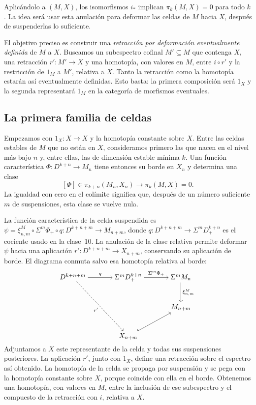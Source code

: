 Aplicándolo a $(M,X)$, los isomorfismos $i_*$ implican $\pi_k(M,X)=0$ para todo $k$. La idea será usar esta anulación para deformar las celdas de $M$ hacia $X$, después de suspenderlas lo suficiente.

El objetivo preciso es construir una \emph{retracción por deformación eventualmente definida} de $M$ a $X$. Buscamos un subespectro cofinal $M'\subseteq M$ que contenga $X$, una retracción $r'\colon M'\to X$ y una homotopía, con valores en $M$, entre $i\circ r'$ y la restricción de $1_M$ a $M'$, relativa a $X$. Tanto la retracción como la homotopía estarán así eventualmente definidas. Esto basta: la primera composición será $1_X$ y la segunda representará $1_M$ en la categoría de morfismos eventuales.

\subsection{La primera familia de celdas}

Empezamos con $1_X\colon X\to X$ y la homotopía constante sobre $X$. Entre las celdas estables de $M$ que no están en $X$, consideramos primero las que nacen en el nivel más bajo $n$ y, entre ellas, las de dimensión estable mínima $k$. Una función característica $\Phi\colon D^{k+n}\to M_n$ tiene entonces su borde en $X_n$ y determina una clase
\[
[\Phi]\in\pi_{k+n}(M_n,X_n)
\longrightarrow\pi_k(M,X)=0.
\]
La igualdad con cero en el colímite significa que, después de un número suficiente $m$ de suspensiones, esta clase se vuelve nula.

La función característica de la celda suspendida es
$\psi=\xi^M_{n,m}\circ\Sigma^m\Phi_+\circ q\colon D^{k+n+m}\to M_{n+m}$, donde $q\colon D^{k+n+m}\to\Sigma^mD^{k+n}_+$ es el cociente usado en la clase~10. La anulación de la clase relativa permite deformar $\psi$ hacia una aplicación $r'\colon D^{k+n+m}\to X_{n+m}$, conservando su aplicación de borde. El diagrama conmuta salvo esa homotopía relativa al borde:
\[
\begin{tikzcd}[cramped,column sep=large,row sep=large]
D^{k+n+m} \arrow[r,"q"] \arrow[ddr,dashed,"r'"']
& \Sigma^mD^{k+n}_+ \arrow[r,"\Sigma^m\Phi_+"]
& \Sigma^mM_n \arrow[d,"\xi^M_{n,m}"]\\
&& M_{n+m}\\
& X_{n+m} \arrow[ur,hook] &
\end{tikzcd}
\]
Adjuntamos a $X$ este representante de la celda y todas sus suspensiones posteriores. La aplicación $r'$, junto con $1_X$, define una retracción sobre el espectro así obtenido. La homotopía de la celda se propaga por suspensión y se pega con la homotopía constante sobre $X$, porque coincide con ella en el borde. Obtenemos una homotopía, con valores en $M$, entre la inclusión de ese subespectro y el compuesto de la retracción con $i$, relativa a $X$.

